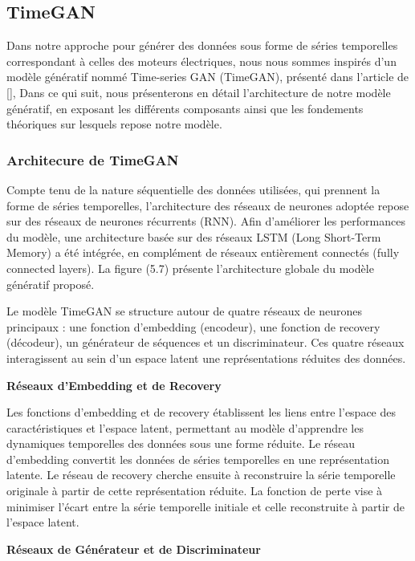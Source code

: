 \subsection{TimeGAN}

Dans notre approche pour générer des données sous forme de séries temporelles
correspondant à celles des moteurs électriques, nous nous sommes inspirés d'un
modèle génératif nommé Time-series GAN (TimeGAN), présenté dans l'article de
  [\cite{yoon2019time}], Dans ce qui suit, nous présenterons en détail
l'architecture de notre modèle génératif, en exposant les différents composants
ainsi que les fondements théoriques sur lesquels repose notre modèle.

\subsubsection{Architecure de TimeGAN}

Compte tenu de la nature séquentielle des données utilisées, qui prennent la
forme de séries temporelles, l'architecture des réseaux de neurones adoptée
repose sur des réseaux de neurones récurrents (RNN). Afin d'améliorer les
performances du modèle, une architecture basée sur des réseaux LSTM (Long
Short-Term Memory) a été intégrée, en complément de réseaux entièrement
connectés (fully connected layers). La figure (5.7) présente l'architecture
globale du modèle génératif proposé.

Le modèle TimeGAN se structure autour de quatre réseaux de neurones principaux
: une fonction d'embedding (encodeur), une fonction de recovery (décodeur), un
générateur de séquences et un discriminateur. Ces quatre réseaux interagissent
au sein d'un espace latent une représentations réduites des données.

\textbf{Réseaux d'Embedding et de Recovery}

Les fonctions d'embedding et de recovery établissent les liens entre l'espace
des caractéristiques et l'espace latent, permettant au modèle d'apprendre les
dynamiques temporelles des données sous une forme réduite. Le réseau
d'embedding convertit les données de séries temporelles en une représentation
latente. Le réseau de recovery cherche ensuite à reconstruire la série
temporelle originale à partir de cette représentation réduite. La fonction de
perte vise à minimiser l'écart entre la série temporelle initiale et celle
reconstruite à partir de l'espace latent.

\textbf{Réseaux de Générateur et de Discriminateur}

